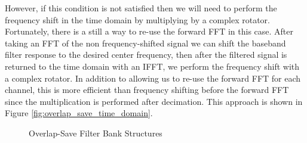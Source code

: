 \documentclass[12pt]{article}
\begin{document}
However, if this condition is not satisfied then we will need to perform the
frequency shift in the time domain by multiplying by a complex rotator.
Fortunately, there is a still a way to re-use the forward FFT in this case.
After taking an FFT of the non frequency-shifted signal we can shift the
baseband filter response to the desired center frequency, then after the
filtered signal is returned to the time domain with an IFFT, we perform the
frequency shift with a complex rotator.  In addition to allowing us to re-use
the forward FFT for each channel, this is more efficient than frequency
shifting before the forward FFT since the multiplication is performed after
decimation. This approach is shown in Figure
\ref{fig:overlap_save_time_domain}.

\begin{figure}[bh!]
\centerline{
    \hfill
}
\caption{Overlap-Save Filter Bank Structures}
\label{fig:overlap_save_filter_banks}
\end{figure}
\end{document}

